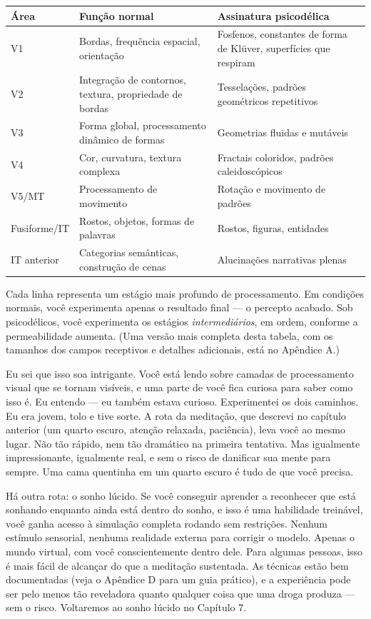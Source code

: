 \documentclass[11pt, twoside, openright]{book}
\begin{document}
\small
\begin{xltabular}{\linewidth}{X X X}
\toprule
\textbf{Área} & \textbf{Função normal} & \textbf{Assinatura psicodélica} \\
\midrule\endhead
V1 & Bordas, frequência espacial, orientação & Fosfenos, constantes de forma de Klüver, superfícies que respiram \\[4pt]
V2 & Integração de contornos, textura, propriedade de bordas & Tesselações, padrões geométricos repetitivos \\[4pt]
V3 & Forma global, processamento dinâmico de formas & Geometrias fluidas e mutáveis \\[4pt]
V4 & Cor, curvatura, textura complexa & Fractais coloridos, padrões caleidoscópicos \\[4pt]
V5/\allowbreak{}MT & Processamento de movimento & Rotação e movimento de padrões \\[4pt]
Fusiforme/\allowbreak{}IT & Rostos, objetos, formas de palavras & Rostos, figuras, entidades \\[4pt]
IT anterior & Categorias semânticas, construção de cenas & Alucinações narrativas plenas \\[4pt]
\bottomrule
\end{xltabular}
\normalsize


Cada linha representa um estágio mais profundo de processamento. Em condições normais, você experimenta apenas o resultado final --- o percepto acabado. Sob psicodélicos, você experimenta os estágios \textit{intermediários}, em ordem, conforme a permeabilidade aumenta. (Uma versão mais completa desta tabela, com os tamanhos dos campos receptivos e detalhes adicionais, está no Apêndice A.)

Eu sei que isso soa intrigante. Você está lendo sobre camadas de processamento visual que se tornam visíveis, e uma parte de você fica curiosa para saber como isso é. Eu entendo --- eu também estava curioso. Experimentei os dois caminhos. Eu era jovem, tolo e tive sorte. A rota da meditação, que descrevi no capítulo anterior (um quarto escuro, atenção relaxada, paciência), leva você ao mesmo lugar. Não tão rápido, nem tão dramático na primeira tentativa. Mas igualmente impressionante, igualmente real, e sem o risco de danificar sua mente para sempre. Uma cama quentinha em um quarto escuro é tudo de que você precisa.

Há outra rota: o sonho lúcido. Se você conseguir aprender a reconhecer que está sonhando enquanto ainda está dentro do sonho, e isso é uma habilidade treinável, você ganha acesso à simulação completa rodando sem restrições. Nenhum estímulo sensorial, nenhuma realidade externa para corrigir o modelo. Apenas o mundo virtual, com você conscientemente dentro dele. Para algumas pessoas, isso é mais fácil de alcançar do que a meditação sustentada. As técnicas estão bem documentadas (veja o Apêndice D para um guia prático), e a experiência pode ser pelo menos tão reveladora quanto qualquer coisa que uma droga produza --- sem o risco. Voltaremos ao sonho lúcido no Capítulo 7.
\end{document}
